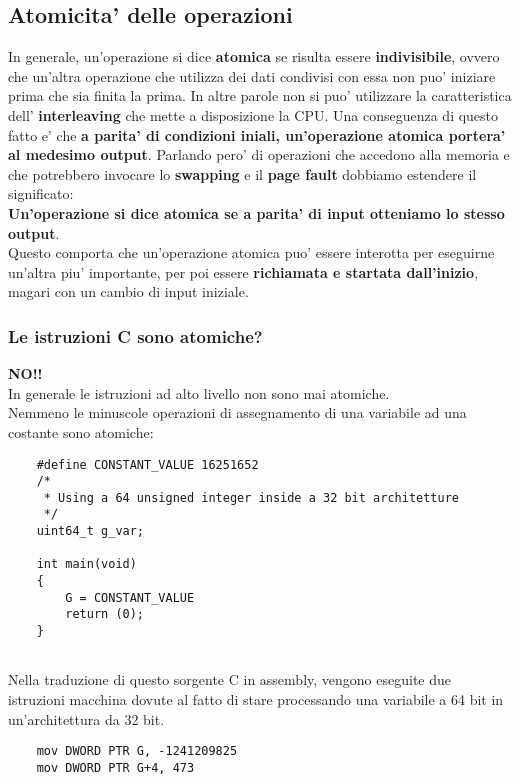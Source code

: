 \documentclass{article}
\begin{document}
    \subsection{Atomicita' delle operazioni}
        In generale, un'operazione si dice \textbf{atomica} se risulta
        essere \textbf{indivisibile}, ovvero che un'altra operazione
        che utilizza dei dati condivisi con essa non puo' iniziare prima
        che sia finita la prima.
        In altre parole non si puo' utilizzare la caratteristica dell'
        \textbf{interleaving} che mette a disposizione la CPU.
        Una conseguenza di questo fatto e' che \textbf{a parita' di condizioni iniali, un'operazione atomica portera' al medesimo
        output}.
        Parlando pero' di operazioni che accedono alla memoria e che 
        potrebbero invocare lo \textbf{swapping} e il \textbf{page fault}
        dobbiamo estendere il significato:
        \\
        \textbf{Un'operazione si dice atomica se a parita' di input otteniamo lo stesso output}.        
        \\
        Questo comporta che un'operazione atomica puo' essere interotta per eseguirne un'altra piu' importante, per poi essere \textbf{richiamata e startata dall'inizio}, magari con un cambio di input iniziale.
        \subsubsection{Le istruzioni C sono atomiche?} 
            \textbf{NO!!} 
            \\
            In generale le istruzioni ad alto livello non sono mai atomiche.
            \\
            Nemmeno le minuscole operazioni di assegnamento di una variabile ad una costante sono atomiche:

            \begin{verbatim}
    #define CONSTANT_VALUE 16251652
    /* 
     * Using a 64 unsigned integer inside a 32 bit architetture
     */                
    uint64_t g_var;

    int main(void)
    {
        G = CONSTANT_VALUE
        return (0);
    }
                
            \end{verbatim}
            Nella traduzione di questo sorgente C in assembly, vengono eseguite due istruzioni macchina dovute al fatto di stare processando una variabile a 64 bit in un'architettura da 32 bit.
            \\
            \begin{verbatim}
    mov DWORD PTR G, -1241209825
    mov DWORD PTR G+4, 473 
            \end{verbatim}
\end{document}
